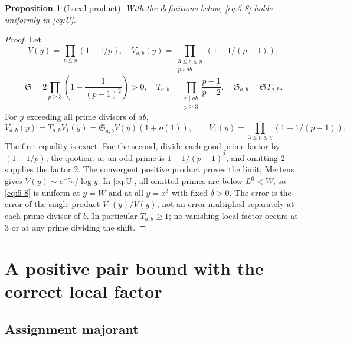 \documentclass[11pt]{article}
\newtheorem{proposition}[theorem]{Proposition}
\theoremstyle{definition}
\theoremstyle{definition}
\begin{document}
\begin{proposition}[Local product]\label{prop:local-product}
With the definitions below, \eqref{eq:5-8} holds uniformly in \eqref{eq:U}.
\end{proposition}
\begin{proof}
Let
\begin{equation*}
V(y)=\prod_{p\le y}(1-1/p),\quad
 V_{a,b}(y)=\prod_{\substack{3\le p\le y\\p\nmid ab}}
                     (1-1/(p-1)),
\end{equation*}
\begin{equation}
\mathfrak S=2\prod_{p\ge3}\left(1-\frac1{(p-1)^2}\right)>0,\quad
 T_{a,b}=\prod_{\substack{p\mid ab\\p\ge3}}\frac{p-1}{p-2},
 \quad\mathfrak S_{a,b}=\mathfrak S T_{a,b}.              \tag{5.7}\label{eq:5-7}
\end{equation}
For \(y\) exceeding all prime divisors of \(ab\),
\begin{equation}
V_{a,b}(y)=T_{a,b}V_1(y)
          =\mathfrak S_{a,b}V(y)(1+o(1)),
 \qquad V_1(y)=\prod_{3\le p\le y}(1-1/(p-1)).            \tag{5.8}\label{eq:5-8}
\end{equation}
The first equality is exact. For the second, divide each good-prime factor by \((1-1/p)\); the quotient at an odd prime is
\(1-1/(p-1)^2\), and omitting 2 supplies the factor 2. The convergent positive product proves the limit; Mertens gives \(V(y)\sim e^{-\gamma_E}/\log y\). In \eqref{eq:U}, all omitted primes are below \(L^6<W\), so \eqref{eq:5-8} is uniform at \(y=W\) and at all \(y=x^\delta\) with fixed \(\delta>0\). The error is the error of the single product \(V_1(y)/V(y)\), not an error multiplied separately at each prime divisor of \(b\). In particular \(T_{a,b}\ge1\); no vanishing local factor occurs at 3 or at any prime dividing the shift.


\end{proof}

\section{A positive pair bound with the correct local factor}\label{sec:s6}

\subsection{Assignment majorant}\label{sec:s6.1}
\end{document}
